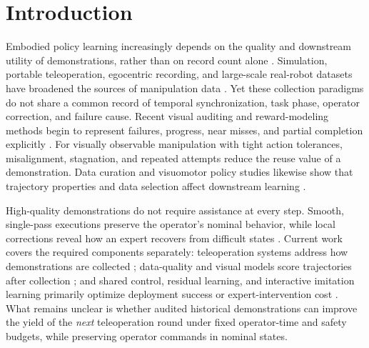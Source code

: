\section{Introduction}
\label{sec:introduction}

Embodied policy learning increasingly depends on the quality and downstream
utility of demonstrations, rather than on record count alone
\citep{yeDataPyramidEmbodied2026,hejnaRobotDataCuration2025,hoqueEGODEXLEARNINGDEXTEROUSMANIPULATION2026,collaborationOpenXEmbodimentRobotic2025}.
Simulation, portable teleoperation, egocentric recording, and large-scale
real-robot datasets have broadened the sources of manipulation data
\citep{collaborationOpenXEmbodimentRobotic2025,chiUniversalManipulationInterface2024,khazatskyDROIDLargeScaleInTheWild2024,hoqueEGODEXLEARNINGDEXTEROUSMANIPULATION2026,mandlekarMimicGenDataGeneration2023}.
Yet these collection paradigms do not share a common record of temporal
synchronization, task phase, operator correction, and failure cause. Recent
visual auditing and reward-modeling methods begin to represent failures,
progress, near misses, and partial completion explicitly
\citep{duanAHAVisionLanguageModelDetecting2024,leeRoboRewardGeneralPurposeVisionLanguage2026,sermanetRoboVQAMultimodalLongHorizon2024,wuLargeRewardModels2026}.
For visually observable manipulation with tight action tolerances,
misalignment, stagnation, and repeated attempts reduce the reuse value of a
demonstration. Data curation and visuomotor policy studies likewise show that
trajectory properties and data selection affect downstream learning
\citep{hejnaRobotDataCuration2025,chiDiffusionPolicyVisuomotor2024,zhaoLearningFineGrainedBimanual2023}.

High-quality demonstrations do not require assistance at every step. Smooth,
single-pass executions preserve the operator's nominal behavior, while local
corrections reveal how an expert recovers from difficult states
\citep{rossReductionImitationLearning2011,liuRobotLearningJob2023,luoPreciseDexterousRobotic}.
Current work covers the required components separately: teleoperation systems
address how demonstrations are collected
\citep{wuGELLOGeneralLowCost2024,chengOpenTeleVisionTeleoperationImmersive2024,wangDexCapScalablePortable2024,qinAnyTeleopGeneralVisionBased2024,xuDexUMIUsingHuman2025};
data-quality and visual models score trajectories after collection
\citep{hejnaRobotDataCuration2025,duanAHAVisionLanguageModelDetecting2024,leeRoboRewardGeneralPurposeVisionLanguage2026};
and shared control, residual learning, and interactive imitation learning
primarily optimize deployment success or expert-intervention cost
\citep{johanninkResidualReinforcementLearning2019,javdaniSharedAutonomyHindsight2015,hoqueThriftyDAggerBudgetAwareNovelty2021,welteFlowCorrectEfficientInteractive2026a}.
What remains unclear is whether audited historical demonstrations can improve
the yield of the \emph{next} teleoperation round under fixed operator-time and
safety budgets, while preserving operator commands in nominal states.

